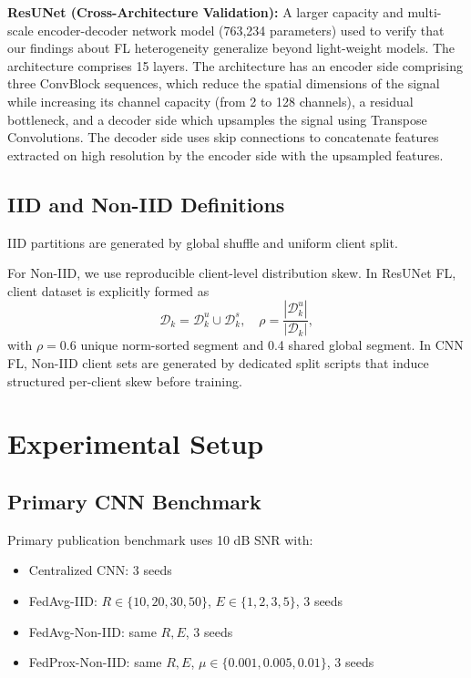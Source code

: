 \documentclass{llncs}
\begin{document}
\textbf{ResUNet (Cross-Architecture Validation):} A larger capacity and multi-scale encoder-decoder network model (763,234 parameters) used to verify that our findings about
FL heterogeneity generalize beyond light-weight models. The architecture comprises 15 layers. The architecture has an encoder side comprising three ConvBlock sequences, which reduce the spatial dimensions of the signal while increasing its channel capacity (from 2 to 128 channels), a residual bottleneck, and a decoder side which upsamples the signal using Transpose Convolutions. The decoder side uses skip connections to concatenate features extracted on high resolution by the encoder side with the upsampled features.

\subsection{IID and Non-IID Definitions}
IID partitions are generated by global shuffle and uniform client split.

For Non-IID, we use reproducible client-level distribution skew. In ResUNet FL, client dataset is explicitly formed as
\begin{equation}
\mathcal{D}_k=\mathcal{D}_k^u \cup \mathcal{D}_k^s,\quad \rho=\frac{|\mathcal{D}_k^u|}{|\mathcal{D}_k|},
\end{equation}
with $\rho=0.6$ unique norm-sorted segment and 0.4 shared global segment. In CNN FL, Non-IID client sets are generated by dedicated split scripts that induce structured per-client skew before training.


\section{Experimental Setup}
\subsection{Primary CNN Benchmark}
Primary publication benchmark uses 10 dB SNR with:
\begin{itemize}
    \item Centralized CNN: 3 seeds
    \item FedAvg-IID: $R\in\{10,20,30,50\}$, $E\in\{1,2,3,5\}$, 3 seeds
    \item FedAvg-Non-IID: same $R,E$, 3 seeds
    \item FedProx-Non-IID: same $R,E$, $\mu\in\{0.001,0.005,0.01\}$, 3 seeds
\end{itemize}
\end{document}
